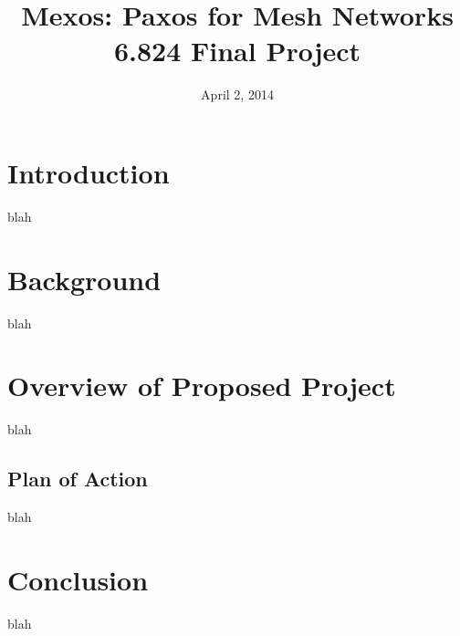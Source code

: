 \documentclass[12pt, titlepage]{article}
\title{Mexos: Paxos for Mesh Networks \\
\large
6.824 Final Project}
\author{  
  \name{Colleen Josepshon}{cjoseph@mit.edu}
  \name{Pranjal Vachaspati}{pranjal@mit.edu}
  \name{Steven Valdez}{dvorak42@mit.edu}
  \name{Joseph DelPreto}{delpreto@mit.edu}
}
\date{
  April 2, 2014 }
\begin{document}
\maketitle

\section{Introduction}
blah

\section{Background}
blah

\section{Overview of Proposed Project}
blah

\subsection{Plan of Action}
blah

\section{Conclusion}
blah
\end{document}

